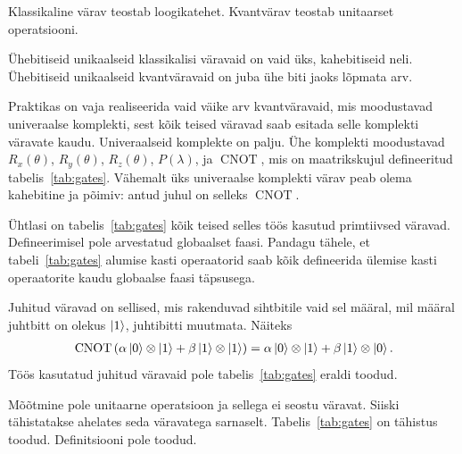 \documentclass[12pt]{report}
\def\paren#1{\left(#1\right)}
\def\ket#1{\mathinner{|#1\rangle}}
\def\CNOT{\mathop{\mathrm{CNOT}}\nolimits}
\begin{document}
Klassikaline värav teostab loogikatehet.
Kvantvärav teostab unitaarset operatsiooni.

Ühebitiseid unikaalseid klassikalisi väravaid on vaid üks, kahebitiseid neli.
Ühebitiseid unikaalseid kvantväravaid on juba ühe biti jaoks lõpmata arv.

Praktikas on vaja realiseerida vaid väike arv kvantväravaid, mis moodustavad univeraalse komplekti, sest kõik teised väravad saab esitada selle komplekti väravate kaudu.
Univeraalseid komplekte on palju.
Ühe komplekti moodustavad \(R_x(\theta)\), \(R_y(\theta)\), \(R_z(\theta)\), \(P(\lambda)\), ja \(\CNOT\), mis on maatrikskujul defineeritud tabelis~\ref{tab:gates}.
Vähemalt üks univeraalse komplekti värav peab olema kahebitine ja põimiv: antud juhul on selleks \(\CNOT\).

Ühtlasi on tabelis~\ref{tab:gates} kõik teised selles töös kasutud primtiivsed väravad.
Defineerimisel pole arvestatud globaalset faasi.
Pandagu tähele, et tabeli~\ref{tab:gates} alumise kasti operaatorid saab kõik defineerida ülemise kasti operaatorite kaudu globaalse faasi täpsusega.

Juhitud väravad on sellised, mis rakenduvad sihtbitile vaid sel määral, mil määral juhtbitt on olekus \(\ket1\), juhtibitti muutmata.
Näiteks
\begin{align}
    \CNOT \paren{\alpha \ket{0} \otimes \ket{1} + \beta \ket{1} \otimes \ket{1}}
    = \alpha \ket{0} \otimes \ket{1} + \beta \ket{1} \otimes \ket{0} \rlap{.}
\end{align}
Töös kasutatud juhitud väravaid pole tabelis~\ref{tab:gates} eraldi toodud.

Mõõtmine pole unitaarne operatsioon ja sellega ei seostu väravat.
Siiski tähistatakse ahelates seda väravatega sarnaselt.
Tabelis~\ref{tab:gates} on tähistus toodud.
Definitsiooni pole toodud.
\end{document}
